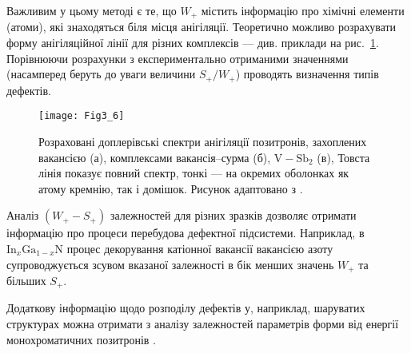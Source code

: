 Важливим у цьому методі є те, що $W_+$ містить
інформацію про хімічні елементи (атоми), які знаходяться біля місця анігіляції.
Теоретично можливо розрахувати форму анігіляційної лінії для
різних комплексів --- див. приклади на рис.~\ref{F36}.
Порівнюючи розрахунки з експериментально отриманими значеннями
(насамперед беруть до уваги величини $S_+/W_+$) проводять
визначення типів дефектів.

\begin{figure}[!b]
\center
\vspace{-5mm}
\texttt{[image: Fig3\_6]}
\vspace{-3mm}
\caption{Розраховані доплерівські
спектри анігіляції позитронів, захоплених
вакансією (а), комплексами вакансія--сурма (б),
$\mbox{V}-\mbox{Sb}_2$ (в),
Товста лінія показує повний спектр,
тонкі --- на окремих оболонках як атому кремнію,
так і домішок.
Рисунок адаптовано з \cite{PAS}.
}
\vspace{-3mm}
\label{F36}
\end{figure}

Аналіз $(W_+-S_+)$ залежностей для різних зразків
дозволяє отримати інформацію про процеси перебудова дефектної підсистеми.
Наприклад, в $\text{In}_x\text{Ga}_{1-x}\text{N}$
процес декорування катіонної вакансії
вакансією азоту супроводжується зсувом вказаної залежності в бік
менших значень $W_+$ та більших $S_+$.



Додаткову інформацію щодо розподілу дефектів
у, наприклад, шаруватих структурах
можна отримати з аналізу залежностей параметрів
форми від енергії монохроматичних позитронів \cite{Uedono_2014}.
